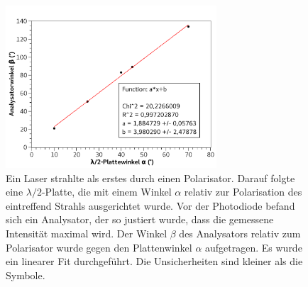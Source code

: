 \documentclass[
	a4paper,
	12pt,
	pagesize,
	ngerman
]{scrartcl}
\begin{document}
	\begin{figure}[H]
		\includegraphics[width=0.7\textwidth]{fig_lambda}
		\centering
		\caption{Ein Laser strahlte als erstes durch einen Polarisator. 
		Darauf folgte eine $\lambda/2$-Platte, die mit einem Winkel $\alpha$ relativ zur Polarisation des eintreffend Strahls ausgerichtet wurde. 
		Vor der Photodiode befand sich ein Analysator, der so justiert wurde, dass die gemessene Intensität maximal wird.
		Der Winkel $\beta$ des Analysators relativ zum Polarisator wurde gegen den Plattenwinkel $\alpha$ aufgetragen.
		Es wurde ein linearer Fit durchgeführt.
		Die Unsicherheiten sind kleiner als die Symbole.} %
		\label{fig_lambda}
		\centering
	\end{figure}
\end{document}
